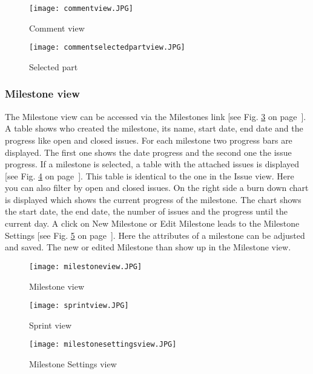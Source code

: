     \begin{figure}[h]
        \centering
        \texttt{[image: commentview.JPG]}
        \caption{Comment view}
        \label{fig: commentview}
    \end{figure}

    \begin{figure}[h]
        \centering
        \texttt{[image: commentselectedpartview.JPG]}
        \caption{Selected part}
        \label{fig: commentselectedpartview}
    \end{figure}

    \subsubsection*{Milestone view}
    The Milestone view can be accessed via the Milestones link [see Fig. \ref{fig: milestoneview} on page~\pageref{fig: milestoneview}]. A table shows who created the milestone, its name, start date, end date and the progress like open and closed issues. For each milestone two progress bars are displayed. The first one shows the date progress and the second one the issue progress. If a milestone is selected, a table with the attached issues is displayed [see Fig. \ref{fig: sprintview} on page~\pageref{fig: sprintview}]. This table is identical to the one in the Issue view. Here you can also filter by open and closed issues. On the right side a burn down chart is displayed which shows the current progress of the milestone. The chart shows the start date, the end date, the number of issues and the progress until the current day. A click on New Milestone or Edit Milestone leads to the Milestone Settings [see Fig. \ref{fig: milestonesettingsview} on page~\pageref{fig: milestonesettingsview}]. Here the attributes of a milestone can be adjusted and saved. The new or edited Milestone than show up in the Milestone view.

    \begin{figure}[h]
        \centering
        \texttt{[image: milestoneview.JPG]}
        \caption{Milestone view}
        \label{fig: milestoneview}
    \end{figure}

    \begin{figure}[h]
        \centering
        \texttt{[image: sprintview.JPG]}
        \caption{Sprint view}
        \label{fig: sprintview}
    \end{figure}

    \begin{figure}[h]
        \centering
        \texttt{[image: milestonesettingsview.JPG]}
        \caption{Milestone Settings view}
        \label{fig: milestonesettingsview}
    \end{figure}


